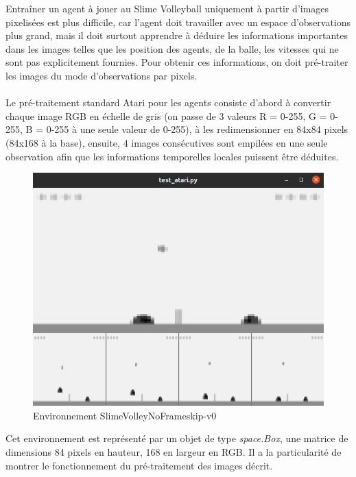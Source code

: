 \documentclass[11pt, a4paper]{article}
\begin{document}
\begin{itemize}
  
  Entraîner un agent à jouer au Slime Volleyball uniquement à partir d'images pixelisées est plus difficile, car l'agent doit travailler avec un espace d'observations plus grand, 
  mais il doit surtout apprendre à déduire les informations importantes dans les images telles que les position des agents, de la balle, les vitesses qui ne sont pas explicitement fournies. Pour obtenir ces informations, on doit pré-traiter les images du mode d'observations par pixels. \\\\
  Le pré-traitement standard Atari \cite{TRAINING.md} pour les agents consiste d'abord à convertir chaque image RGB en échelle de gris (on passe de 3 valeurs R = 0-255, G = 0-255, B = 0-255 à une seule valeur de 0-255), à les redimensionner en 84x84 pixels (84x168 à la base), 
  ensuite, 4 images consécutives sont empilées en une seule observation afin que les informations temporelles locales puissent être déduites.\\

	
 \begin{figure}[H]
    \centering
    \includegraphics[scale=0.5]{../images/atari.png}
    \caption {Environnement SlimeVolleyNoFrameskip-v0}
\end{figure}
 
  Cet environnement est représenté par un objet de type \textit{space.Box}, une matrice de dimensions 84 pixels en hauteur, 168 en largeur en RGB. Il a la particularité de montrer le fonctionnement du pré-traitement des images décrit.\\


\end{itemize}
\end{document}
